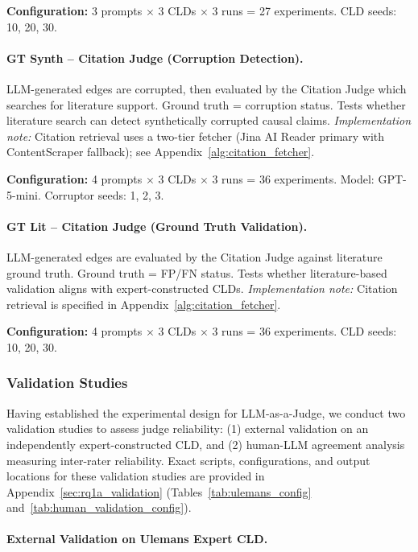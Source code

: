 \textbf{Configuration:} 3 prompts $\times$ 3 CLDs $\times$ 3 runs = 27 experiments. CLD seeds: 10, 20, 30.

\paragraph{GT Synth -- Citation Judge (Corruption Detection).}
LLM-generated edges are corrupted, then evaluated by the Citation Judge which searches for literature support. Ground truth = corruption status. Tests whether literature search can detect synthetically corrupted causal claims.
\textit{Implementation note:} Citation retrieval uses a two-tier fetcher (Jina AI Reader primary with ContentScraper fallback); see Appendix~\ref{alg:citation_fetcher}.

\textbf{Configuration:} 4 prompts $\times$ 3 CLDs $\times$ 3 runs = 36 experiments. Model: GPT-5-mini. Corruptor seeds: 1, 2, 3.

\paragraph{GT Lit -- Citation Judge (Ground Truth Validation).}
LLM-generated edges are evaluated by the Citation Judge against literature ground truth. Ground truth = FP/FN status. Tests whether literature-based validation aligns with expert-constructed CLDs.
\textit{Implementation note:} Citation retrieval is specified in Appendix~\ref{alg:citation_fetcher}.

\textbf{Configuration:} 4 prompts $\times$ 3 CLDs $\times$ 3 runs = 36 experiments. CLD seeds: 10, 20, 30.

\subsubsection{Validation Studies}

Having established the experimental design for LLM-as-a-Judge, we conduct two validation studies to assess judge reliability: (1) external validation on an independently expert-constructed CLD, and (2) human-LLM agreement analysis measuring inter-rater reliability.
Exact scripts, configurations, and output locations for these validation studies are provided in Appendix~\ref{sec:rq1a_validation} (Tables~\ref{tab:ulemans_config} and~\ref{tab:human_validation_config}).

\paragraph{External Validation on Ulemans Expert CLD.}

